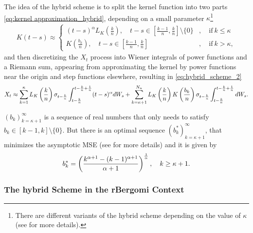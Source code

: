 The idea of the hybrid scheme  is to split the kernel function into two parts \ref{eq:kernel approximation_hybrid}, depending on a small parameter $\kappa$\footnote{There are different variants of the hybrid scheme depending on the value of $\kappa$ (see \cite{bennedsen2017hybrid} for more details).} 
\begin{align}\label{eq:kernel approximation_hybrid}
 K(t-s)\approx\begin{cases}
              (t-s)^\alpha L_K\left(\frac{k}{n}\right), \quad t-s \in \left[\frac{k-1}{n},\frac{k}{n}\right] \setminus \{0\}&, \quad \text{if} \: k \le \kappa \\
           K\left(\frac{b_k}{n}\right) , \quad t-s \in \left[\frac{k-1}{n},\frac{k}{n}\right] &, \quad \text{if}\:  k >\kappa,
            \end{cases}
\end{align}
and then discretizing the  $X_t$ process into Wiener integrals of power functions and a Riemann sum, appearing from approximating the kernel by power functions near the origin and step functions elsewhere, resulting in \ref{eq:hybrid_scheme_2}
\begin{align}\label{eq:hybrid_scheme_2}
X_t \approx \sum_{k=1}^\kappa    L_K\left(\frac{k}{n}\right) \sigma_{t-\frac{k}{n}} \int_{t-\frac{k}{n}}^{t-\frac{k}{n}+\frac{1}{n}} (t-s)^\alpha   dW_s+ \sum_{k=\kappa+1}^{N_n}  L_K\left(\frac{k}{n}\right)  K\left(\frac{b_k}{n}\right) \sigma_{t-\frac{k}{n}} \int_{t-\frac{k}{n}}^{t-\frac{k}{n}+\frac{1}{n}}   dW_s .
\end{align}
\begin{remark}
$\left(b_k\right)_{k=\kappa+1}^\infty$ is a sequence of real numbers that only needs to satisfy  $b_k \in \left[k-1, k\right]\setminus \{0\}$. But there is an optimal sequence $\left(b_k^\ast\right)_{k=\kappa+1}^\infty$, that
minimizes the asymptotic MSE (see \cite{bennedsen2017hybrid} for more details) and it is given by
$$ b_k^\ast=\left(\frac{k^{\alpha+1}-(k-1)^{\alpha+1 }}{\alpha+1}\right)^{\frac{1}{\alpha}},\quad k \ge \kappa+1 .$$
\end{remark}

\subsubsection{The hybrid Scheme in the rBergomi Context}

